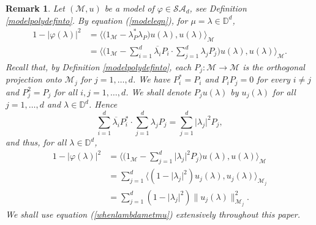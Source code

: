 \documentclass[11pt, reqno]{amsart}
\newtheorem{remark}[theorem]{Remark}
\newcommand\1{\boldsymbol {1}}
\numberwithin{equation}{section}
\begin{document}
\begin{remark} \label{mu=la} \rm Let $(\mathcal{M},u)$ be a model of $\varphi \in \mathcal{SA}_{d}$, see Definition \ref{modelpolydefinto}.
By equation (\ref{modeleqn}), for $\mu=\lambda\in\mathbb{D}^{d}$,
\begin{align}
1-\lvert\varphi(\lambda)\rvert^{2} &= \Big\langle{\big(1_{\mathcal{M}}-\lambda_{P}^{*}\lambda_{P}\big)u({\lambda}),u({\lambda})} \Big\rangle_{\mathcal{M}}\nonumber\\
&= \Big\langle{\big(1_{\mathcal{M}}-\sum_{i=1}^{d}\overline{\lambda_{i}}P_{i}\cdot\sum_{j=1}^{d}\lambda_{j}P_{j}\big)u({\lambda}),u({\lambda})} \Big\rangle_{\mathcal{M}}.\label{whenlambdaequalsmuinpolymodel}
\end{align}
Recall that, by Definition \ref{modelpolydefinto}, each $P_{j}:\mathcal{M}\rightarrow\mathcal{M}$ is the orthogonal projection onto $\mathcal{M}_{j}$ for $j=1,\hdots,d$. We have $P_{i}^{*}=P_{i}$ and $P_{i}P_{j}=0$ for every $i\neq j$ and $P_{j}^{2}=P_{j}$ for all $i,j=1,\hdots,d$. We shall denote $P_{j}u(\lambda)$ by $u_{j}(\lambda)$ for all $j=1,\hdots,d$ and $\lambda\in\mathbb{D}^{d}$. Hence
$$\sum_{i=1}^{d}\overline{\lambda_{i}}P^{*}_{i}\cdot\sum_{j=1}^{d}\lambda_{j}P_{j} = \sum_{j=1}^{d}\lvert \lambda_{j}\rvert^{2}P_{j},$$
and thus, for all $\lambda\in\mathbb{D}^{d}$,
\begin{align}
1-\lvert\varphi(\lambda)\rvert^{2} &= \Big\langle{\big(1_{\mathcal{M}}-\sum_{j=1}^{d}\lvert \lambda_{j}\rvert^{2}P_{j}\big)u({\lambda}),u({\lambda})} \Big\rangle_{\mathcal{M}}\nonumber\\
    &=\sum_{j=1}^{d}\Big\langle (1-\lvert \lambda_{j}\rvert^{2})u_{j}({\lambda}),u_{j}({\lambda}) \Big\rangle_{\mathcal{M}_{j}}\nonumber\\
    &=\sum_{j=1}^{d}(1-\lvert \lambda_{j}\rvert^{2})\|u_{j}(\lambda)\|^{2}_{\mathcal{M}_{j}}.\label{whenlambdametmu}
\end{align}
We shall use equation (\ref{whenlambdametmu}) extensively throughout this paper.
\end{remark}
\end{document}
